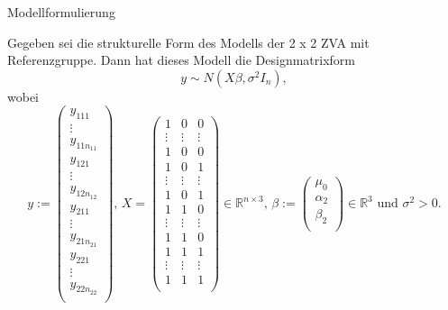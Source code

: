 \documentclass[
  8pt,
  ignorenonframetext,
]{beamer}
\begin{document}
\begin{frame}{Modellformulierung}
\protect\hypertarget{modellformulierung-4}{}
\footnotesize
{}
\vspace{2mm}
\begin{theorem}
\justifying
\normalfont
Gegeben sei die strukturelle Form des Modells der 2 x 2 ZVA mit Referenzgruppe. 
Dann hat dieses Modell die Designmatrixform
\begin{equation}
y \sim N(X\beta,\sigma^2I_n),
\end{equation}
wobei
\begin{equation}
y:=
\begin{pmatrix}
y_{111}\\
\vdots \\
y_{11n_{11}}\\
y_{121}\\
\vdots \\
y_{12n_{12}}\\
y_{211}\\
\vdots \\
y_{21n_{21}}\\
y_{221}\\
\vdots \\
y_{22n_{22}}\\
\end{pmatrix}, \,
X =
\begin{pmatrix}
1       &   0       &   0           \\
\vdots  &   \vdots  &   \vdots      \\
1       &   0       &   0           \\
1       &   0       &   1           \\
\vdots  &   \vdots  &   \vdots      \\
1       &   0       &   1           \\
1       &   1       &   0           \\
\vdots  &   \vdots  &   \vdots      \\
1       &   1       &   0           \\
1       &   1       &   1           \\
\vdots  &   \vdots  &   \vdots      \\
1       &   1       &   1           \\
\end{pmatrix} \in \mathbb{R}^{n \times 3}, \,
\beta :=
\begin{pmatrix}
\mu_0               \\
\alpha_{2}          \\
\beta_{2}           \\
\end{pmatrix}
\in \mathbb{R}^{3}
\mbox{ und }
\sigma^2 > 0.
\end{equation}
\end{theorem}
\vspace{-2mm}


\end{frame}
\end{document}
